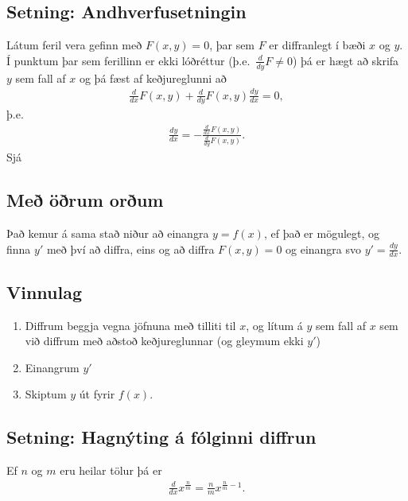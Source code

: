 \documentclass[b5paper,10pt,icelandic]{sphinxmanual}
\begin{document}
\subsection{Setning: Andhverfusetningin}
\label{\detokenize{kafli03:setning-andhverfusetningin}}
Látum feril vera gefinn með \(F(x,y) =0\), þar sem \(F\) er
diffranlegt í bæði \(x\) og \(y\). Í punktum þar sem ferillinn
er ekki lóðréttur (þ.e. \(\frac{d}{dy}F \neq 0\)) þá er hægt að
skrifa \(y\) sem fall af \(x\) og þá fæst af keðjureglunni að
\begin{equation*}
\begin{split}\frac{d}{dx} F(x,y) + \frac{d}{dy}F(x,y) \frac{dy}{dx} = 0,\end{split}
\end{equation*}
þ.e.
\begin{equation*}
\begin{split}\frac{dy}{dx} = -\frac{\frac{d}{dx} F(x,y)}{\frac{d}{dy} F(x,y)}.\end{split}
\end{equation*}
Sjá 


\subsection{Með öðrum orðum}
\label{\detokenize{kafli03:me-orum-orum}}
Það kemur á sama stað niður að einangra \(y=f(x)\), ef það er
mögulegt, og finna \(y'\) með því að diffra, eins og að diffra
\(F(x,y)=0\) og einangra svo \(y'=\frac{dy}{dx}\).


\subsection{Vinnulag}
\label{\detokenize{kafli03:vinnulag}}\begin{enumerate}
\item {} 
Diffrum beggja vegna jöfnuna með tilliti til \(x\), og lítum á
\(y\) sem fall af \(x\) sem við diffrum með aðstoð
keðjureglunnar (og gleymum ekki \(y'\))

\item {} 
Einangrum \(y'\)

\item {} 
Skiptum \(y\) út fyrir \(f(x)\).

\end{enumerate}


\subsection{Setning: Hagnýting á fólginni diffrun}
\label{\detokenize{kafli03:setning-hagnyting-a-folginni-diffrun}}
Ef \(n\) og \(m\) eru heilar tölur þá er
\begin{equation*}
\begin{split}\frac{d}{dx} x^{\frac nm} = \frac nm x^{\frac nm -1}.\end{split}
\end{equation*}
\end{document}
